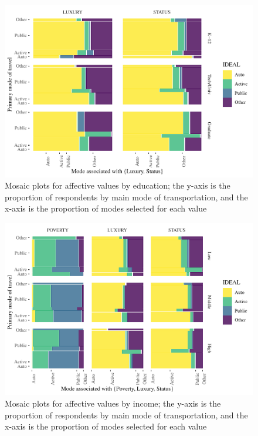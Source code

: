 \documentclass[]{elsarticle} %
\makeatletter
\def\maxwidth{\ifdim\Gin@nat@width>\linewidth\linewidth
\else\Gin@nat@width\fi}
\let\Oldincludegraphics\includegraphics
\renewcommand{\includegraphics}[1]{\Oldincludegraphics[width=\maxwidth]{#1}}
\makeatother
\begin{document}
\begin{figure}
\centering
\includegraphics{Dissonance_Santiago_v1_files/figure-latex/figure-mosaic-plots-by-attribute-and-education-without-instrumental-1.pdf}
\caption{\label{fig:mosaic-plots-by-education}Mosaic plots for affective
values by education; the y-axis is the proportion of respondents by main
mode of transportation, and the x-axis is the proportion of modes
selected for each value}
\end{figure}

\begin{figure}
\centering
\includegraphics{Dissonance_Santiago_v1_files/figure-latex/figure-mosaic-plots-by-attribute-and-income-without-instrumental-1.pdf}
\caption{\label{fig:mosaic-plots-by-income}Mosaic plots for affective
values by income; the y-axis is the proportion of respondents by main
mode of transportation, and the x-axis is the proportion of modes
selected for each value}
\end{figure}
\end{document}
